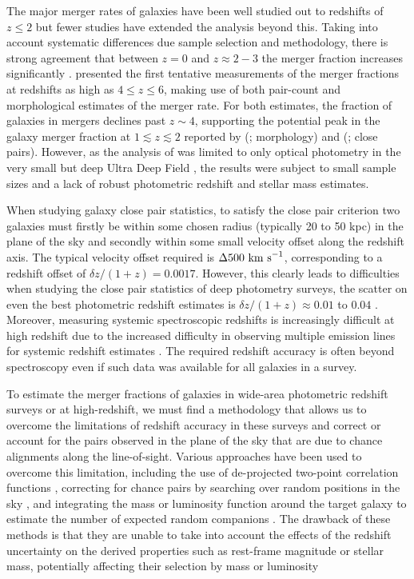 The major merger rates of galaxies have been well studied out to redshifts of $z \leq 2$ but fewer studies have extended the analysis beyond this. Taking into account systematic differences due sample selection and methodology, there is strong agreement that between $z = 0$ and $z\approx 2 - 3$ the merger fraction increases significantly \citep{LopezSanjuan:2010cz,Bluck:2012dh,Ownsworth:2014gt}. \citet{2009MNRAS.397..208C} presented the first tentative measurements of the merger fractions at redshifts as high as $4 \leq z \leq 6$, making use of both pair-count and morphological estimates of the merger rate. For both estimates, the fraction of galaxies in mergers declines past $z\sim4$, supporting the potential peak in the galaxy merger fraction at $1 \lesssim z \lesssim 2$ reported by \citeauthor{Conselice:2008de} (\citeyear{Conselice:2008de}; morphology) and \citeauthor{RyanJr:2008ka} (\citeyear{RyanJr:2008ka}; close pairs). However, as the analysis of \citet{2009MNRAS.397..208C} was limited to only optical photometry in the very small but deep Ultra Deep Field \citep{2006AJ....132.1729B}, the results were subject to small sample sizes and a lack of robust photometric redshift and stellar mass estimates.

When studying galaxy close pair statistics, to satisfy the close pair criterion two galaxies must firstly be within some chosen radius (typically 20 to 50 kpc) in the plane of the sky and secondly within some small velocity offset along the redshift axis. The typical velocity offset required is $\Delta 500~\rm{km~s}^{-1}$, corresponding to a redshift offset of  $\delta z / (1+z) = 0.0017$. However, this clearly leads to difficulties when studying the close pair statistics of deep photometry surveys, the scatter on even the best photometric redshift estimates is $\delta z / (1+z) \approx 0.01$ to $0.04$ \citep{Molino:2014iz}. Moreover, measuring systemic spectroscopic redshifts is increasingly difficult at high redshift due to the increased difficulty in observing multiple emission lines for systemic redshift estimates \citep{2015MNRAS.450.1846S}. The required redshift accuracy is often beyond spectroscopy even if such data was available for all galaxies in a survey.

To estimate the merger fractions of galaxies in wide-area photometric redshift surveys or at high-redshift, we must find a methodology that allows us to overcome the limitations of redshift accuracy in these surveys and correct or account for the pairs observed in the plane of the sky that are due to chance alignments along the line-of-sight. Various approaches have been used to overcome this limitation, including the use of de-projected two-point correlation functions \citep{Bell:2006ey}, correcting for chance pairs by searching over random positions in the sky \citep{Kartaltepe:2007dv}, and integrating the mass or luminosity function around the target galaxy to estimate the number of expected random companions \citep{LeFevre:2000iq,Bluck:2009in,Bundy:2009jw}. The drawback of these methods is that they are unable to take into account the effects of the redshift uncertainty on the derived properties such as rest-frame magnitude or stellar mass, potentially affecting their selection by mass or luminosity


